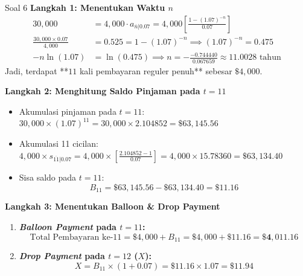 \documentclass[11pt,a4paper]{article}
\begin{document}
\begin{solutionbox}{Soal 6}
\textbf{Langkah 1: Menentukan Waktu $n$}
\begin{align*}
    30{,}000 &= 4{,}000 \cdot a_{\overline{n}|0.07} = 4{,}000 \left[\frac{1 - (1.07)^{-n}}{0.07}\right] \\[0.4em]
    \frac{30{,}000 \times 0.07}{4{,}000} &= 0.525 = 1 - (1.07)^{-n} \implies (1.07)^{-n} = 0.475 \\[0.4em]
    -n \ln(1.07) &= \ln(0.475) \implies n = -\frac{-0.744440}{0.067659} \approx 11.0028 \text{ tahun}
\end{align*}
Jadi, terdapat **$11$ kali pembayaran reguler penuh** sebesar $\$4{,}000$.

\textbf{Langkah 2: Menghitung Saldo Pinjaman pada $t = 11$}
\begin{itemize}
    \item Akumulasi pinjaman pada $t = 11$: $30{,}000 \times (1.07)^{11} = 30{,}000 \times 2.104852 = \$63{,}145.56$
    \item Akumulasi 11 cicilan: $4{,}000 \times s_{\overline{11}|0.07} = 4{,}000 \times \left[\frac{2.104852 - 1}{0.07}\right] = 4{,}000 \times 15.78360 = \$63{,}134.40$
    \item Sisa saldo pada $t = 11$:
    \begin{equation*}
        B_{11} = \$63{,}145.56 - \$63{,}134.40 = \mathbf{\$11.16}
    \end{equation*}
\end{itemize}

\textbf{Langkah 3: Menentukan Balloon \& Drop Payment}
\begin{enumerate}[label=(\alph*)]
    \item \textbf{\textit{Balloon Payment} pada $t = 11$:}
    \begin{equation*}
        \text{Total Pembayaran ke-11} = \$4{,}000 + B_{11} = \$4{,}000 + \$11.16 = \mathbf{\$4{,}011.16}
    \end{equation*}
    \item \textbf{\textit{Drop Payment} pada $t = 12$ ($X$):}
    \begin{equation*}
        X = B_{11} \times (1 + 0.07) = \$11.16 \times 1.07 = \mathbf{\$11.94}
    \end{equation*}
\end{enumerate}
\end{solutionbox}

\vspace{1.5em}
\end{document}
